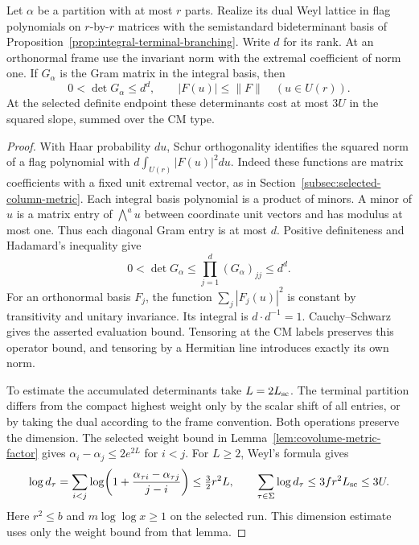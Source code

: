\begin{auxlemma}\label{lem:definite-schur-gram}
Let \(\alpha\) be a partition with at most \(r\) parts. Realize its dual Weyl lattice in flag polynomials on \(r\)-by-\(r\) matrices with the semistandard bideterminant basis of Proposition~\ref{prop:integral-terminal-branching}. Write \(d\) for its rank. At an orthonormal frame use the invariant norm with the extremal coefficient of norm one. If \(G_\alpha\) is the Gram matrix in the integral basis, then
\[
 0<\det G_\alpha\le d^d,\qquad
       |F(u)|\le\|F\|\quad (u\in U(r)).
\]
At the selected definite endpoint these determinants cost at most \(3U\) in the squared slope, summed over the CM type.
\end{auxlemma}
\begin{proof}
With Haar probability \(du\), Schur orthogonality identifies the squared norm of a flag polynomial with \(d\int_{U(r)}|F(u)|^2du\). Indeed these functions are matrix coefficients with a fixed unit extremal vector, as in Section~\ref{subsec:selected-column-metric}. Each integral basis polynomial is a product of minors. A minor of \(u\) is a matrix entry of \(\bigwedge^a u\) between coordinate unit vectors and has modulus at most one. Thus each diagonal Gram entry is at most \(d\). Positive definiteness and Hadamard's inequality give
\[
     0<\det G_\alpha\le\prod_{j=1}^d(G_\alpha)_{jj}\le d^d .
\]
For an orthonormal basis \(F_j\), the function \(\sum_j|F_j(u)|^2\) is constant by transitivity and unitary invariance. Its integral is \(d\cdot d^{-1}=1\). Cauchy--Schwarz gives the asserted evaluation bound. Tensoring at the CM labels preserves this operator bound, and tensoring by a Hermitian line introduces exactly its own norm.

To estimate the accumulated determinants take \(L=2L_{\rm sc}\). The terminal partition differs from the compact highest weight only by the scalar shift of all entries, or by taking the dual according to the frame convention. Both operations preserve the dimension. The selected weight bound in Lemma~\ref{lem:covolume-metric-factor} gives \(\alpha_i-\alpha_j\le2e^{2L}\) for \(i<j\). For \(L\ge2\), Weyl's formula gives
\[
 \log d_\tau
 =\sum_{i<j}\log\!\left(1+\frac{\alpha_{\tau i}-\alpha_{\tau j}}{j-i}\right)
 \le \tfrac32r^2L,\qquad
 \sum_{\tau\in\Sigma}\log d_\tau\le3fr^2 L_{\rm sc}\le3U .
\]
Here \(r^2\le b\) and \(m\log\log x\ge1\) on the selected run. This dimension estimate uses only the weight bound from that lemma.
\end{proof}

